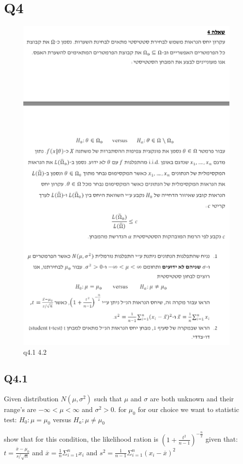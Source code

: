 \newpage

\section{Q4}

\begin{figure}[htbp]
    \centering
    \includegraphics[width=0.65\linewidth]{images/q41.png}
    \caption{q4.1 4.2}
    \label{fig:enter-label}
\end{figure}

\subsection{Q4.1}
Given distribution $N(\mu,\sigma^2)$ such that $\mu$ and $\sigma$ 
are both unknown and their range's are $- \infty < \mu < \infty $
and $\sigma^2>0$.
for $\mu_0$ for our choice we want to statistic test:
$H_0 : \mu = \mu_0 $ versus $H_a:\mu \neq \mu_0$

show that for this condition, the likelihood ration is $\left( 1+\frac{t^2}{n-1}\right)^{-\frac{n}{2}} $
given that:
$t=\frac{\overline{x}-\mu_0}{s/\sqrt{n}}$ and
$\overline{x}=\frac{1}{n}\Sigma^{n}_{i=1}x_i$ and
$s^2=\frac{1}{n-1}\Sigma^{n}_{i=1} \left(x_i - \overline{x} \right)^2$ \\

